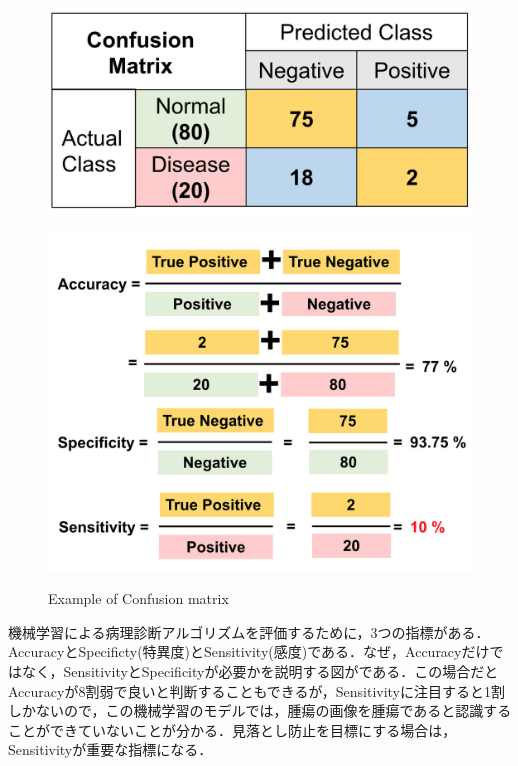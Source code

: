 \begin{figure}[H]
	\centering
	\begin{minipage}{0.7\columnwidth}
		\centering
		\includegraphics[clip, width=0.7\linewidth]{fig/chapter2/confusion_examples}
		\label{fig:confusion_table}
	\end{minipage}
	\begin{minipage}{0.9\columnwidth}
		\centering
		\includegraphics[clip, width=0.7\linewidth]{fig/chapter2/confusion_math}
		\label{fig:confusion_math}
	\end{minipage}
	\caption{Example of Confusion matrix}
	\label{fig:confusion_ex}
\end{figure}

機械学習による病理診断アルゴリズムを評価するために，3つの指標がある．AccuracyとSpecificty(特異度)とSensitivity(感度)である．なぜ，Accuracyだけではなく，SensitivityとSpecificityが必要かを説明する図がである．この場合だとAccuracyが8割弱で良いと判断することもできるが，Sensitivityに注目すると1割しかないので，この機械学習のモデルでは，腫瘍の画像を腫瘍であると認識することができていないことが分かる．見落とし防止を目標にする場合は，Sensitivityが重要な指標になる．

